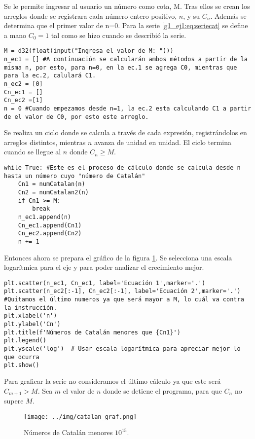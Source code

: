 \documentclass[../portafolio.tex]{subfiles}
\begin{document}
Se le permite ingresar al usuario un número como cota, M. Tras ellos se crean los arreglos donde se registrara cada número entero positivo, $n$, y su $C_n$. Además se determina que el primer valor de n=0. Para la serie \ref{g1_ej1:eq:seriecat} se define a mano $C_0 = 1$ tal como se hizo cuando se describió la serie.
\begin{verbatim}
M = d32(float(input("Ingresa el valor de M: ")))
n_ec1 = [] #A continuación se calcularán ambos métodos a partir de la misma n, por esto, para n=0, en la ec.1 se agrega C0, mientras que para la ec.2, calulará C1.
n_ec2 = [0]
Cn_ec1 = []
Cn_ec2 =[1]    
n = 0 #Cuando empezamos desde n=1, la ec.2 esta calculando C1 a partir de el valor de C0, por esto este arreglo.
\end{verbatim}
Se realiza un ciclo donde se calcula a través de cada expresión, registrándolos en arreglos distintos, mientras $n$ avanza de unidad en unidad. El ciclo termina cuando se llegue al $n$ donde $C_n \geq M$. 
\begin{verbatim}
while True: #Este es el proceso de cálculo donde se calcula desde n hasta un número cuyo "número de Catalán" 
    Cn1 = numCatalan(n)
    Cn2 = numCatalan2(n)
    if Cn1 >= M: 
        break
    n_ec1.append(n)
    Cn_ec1.append(Cn1)
    Cn_ec2.append(Cn2)
    n += 1
\end{verbatim}
Entonces ahora se prepara el gráfico de la figura \ref{g1_ej1:fig:catalan}. Se selecciona una escala logarítmica para el eje y para poder analizar el crecimiento mejor.
\begin{verbatim}
plt.scatter(n_ec1, Cn_ec1, label='Ecuación 1',marker='.')
plt.scatter(n_ec2[:-1], Cn_ec2[:-1], label='Ecuación 2',marker='.') #Quitamos el último numeros ya que será mayor a M, lo cuál va contra la instrucción.
plt.xlabel('n')
plt.ylabel('Cn')
plt.title(f'Números de Catalán menores que {Cn1}')
plt.legend()
plt.yscale('log')  # Usar escala logarítmica para apreciar mejor lo que ocurra
plt.show()
\end{verbatim}
Para graficar la serie no consideramos el último cálculo ya que este será $C_{m+1}>M$. Sea $m$ el valor de $n$ donde se detiene el programa, para que $C_n$ no supere $M$.

\begin{figure}[ht]
\centering
\texttt{[image: ../img/catalan\_graf.png]}
\caption{Números de Catalán menores $10^{15}$.}
\label{g1_ej1:fig:catalan}
\end{figure}
\end{document}

